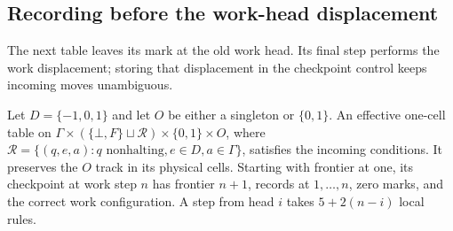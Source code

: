 \subsection{Recording before the work-head displacement}

The next table leaves its mark at the old work head.  Its final step
performs the work displacement; storing that displacement in the
checkpoint control keeps incoming moves unambiguous.

\begin{lemma}
\label{lem:bb-direction}\label{lem:bb-mid-mark-compiler}
Let $D=\{-1,0,1\}$ and let $O$ be either a singleton or $\{0,1\}$.
An effective one-cell table on
$\Gamma\times(\{\bot,F\}\sqcup\mathcal R)\times\{0,1\}\times O$,
where $\mathcal R=\{(q,e,a):q\text{ nonhalting},e\in D,a\in\Gamma\}$,
satisfies the incoming conditions.  It preserves the $O$ track in
its physical cells.  Starting with frontier at one, its checkpoint
at work step $n$ has frontier $n+1$, records at $1,\ldots,n$, zero
marks, and the correct work configuration.  A step from head $i$
takes $5+2(n-i)$ local rules.
\end{lemma}
